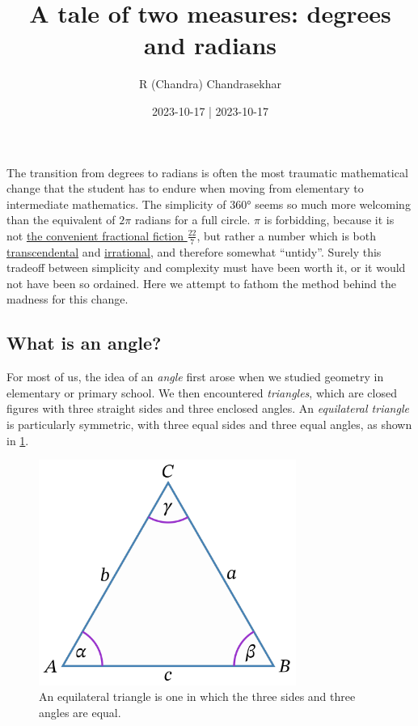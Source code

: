 \documentclass[
  a4paper,
]{article}
\title{A tale of two measures: degrees and radians}
\author{R (Chandra) Chandrasekhar}
\date{2023-10-17 | 2023-10-17}
\begin{document}
\maketitle

\thispagestyle{empty}


The transition from degrees to radians is often the most traumatic
mathematical change that the student has to endure when moving from
elementary to intermediate mathematics. The simplicity of 360° seems so
much more welcoming than the equivalent of \(2\pi\) radians for a full
circle. \(\pi\) is forbidding, because it is not
\href{https://en.wikipedia.org/wiki/Proof_that_22/7_exceeds_\%CF\%80}{the
convenient fractional fiction \(\frac{22}{7}\)}, but rather a number
which is both
\href{https://mathworld.wolfram.com/TranscendentalNumber.html}{transcendental}
and \href{https://en.wikipedia.org/wiki/Irrational_number}{irrational},
and therefore somewhat ``untidy''. Surely this tradeoff between
simplicity and complexity must have been worth it, or it would not have
been so ordained. Here we attempt to fathom the method behind the
madness for this change.

\hypertarget{what-is-an-angle}{%
\subsection{What is an angle?}\label{what-is-an-angle}}

For most of us, the idea of an \emph{angle} first arose when we studied
geometry in elementary or primary school. We then encountered
\emph{triangles}, which are closed figures with three straight sides and
three enclosed angles. An \emph{equilateral triangle} is particularly
symmetric, with three equal sides and three equal angles, as shown in
\cref{fig:equilateral}.

\begin{figure}
\hypertarget{fig:equilateral}{%
\centering
\includegraphics[width=0.75\textwidth,height=\textheight]{images/equilateral.png}
\caption{An equilateral triangle is one in which the three sides and
three angles are equal.}\label{fig:equilateral}
}
\end{figure}
\end{document}
